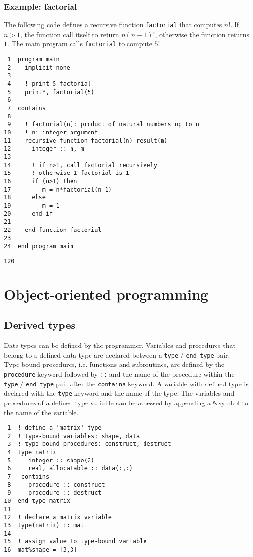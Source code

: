 \documentclass[11pt]{article}
\begin{document}
\subsubsection{Example: factorial}
\label{sec:orgheadline50}
The following code defines a recursive function \texttt{factorial} that computes \(n!\). If \(n>1\), the function call itself to return \(n(n-1)!\), otherwise the function returns \(1\). The main program calls \texttt{factorial} to compute \(5!\).

\begin{verbatim}
 1  program main
 2    implicit none
 3  
 4    ! print 5 factorial
 5    print*, factorial(5)
 6  
 7  contains
 8  
 9    ! factorial(n): product of natural numbers up to n
10    ! n: integer argument
11    recursive function factorial(n) result(m)
12      integer :: n, m
13  
14      ! if n>1, call factorial recursively
15      ! otherwise 1 factorial is 1
16      if (n>1) then
17         m = n*factorial(n-1)
18      else
19         m = 1
20      end if
21  
22    end function factorial
23  
24  end program main
\end{verbatim}

\begin{verbatim}
120
\end{verbatim}

\section{Object-oriented programming}
\label{sec:orgheadline56}
\subsection{Derived types}
\label{sec:orgheadline10}
Data types can be defined by the programmer. Variables and procedures that belong to a defined data type are declared between a \texttt{type} / \texttt{end type} pair. Type-bound procedures, i.e. functions and subroutines, are defined by the \texttt{procedure} keyword followed by \texttt{::} and the name of the procedure within the \texttt{type} / \texttt{end type} pair after the \texttt{contains} keyword. A variable with defined type is declared with the \texttt{type} keyword and the name of the type. The variables and procedures of a defined type variable can be accessed by appending a \texttt{\%} symbol to the name of the variable.

\begin{verbatim}
 1  ! define a 'matrix' type
 2  ! type-bound variables: shape, data
 3  ! type-bound procedures: construct, destruct
 4  type matrix
 5     integer :: shape(2)
 6     real, allocatable :: data(:,:)
 7   contains
 8     procedure :: construct
 9     procedure :: destruct
10  end type matrix
11  
12  ! declare a matrix variable
13  type(matrix) :: mat
14  
15  ! assign value to type-bound variable
16  mat%shape = [3,3]
\end{verbatim}
\end{document}

